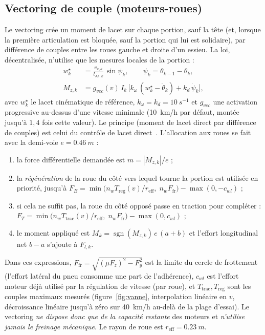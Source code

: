 \documentclass[11pt,a4paper]{article}
\newcommand{\dt}[1]{\dot{#1}}
\begin{document}
\subsection{Vectoring de couple (moteurs-roues)}\label{sec:vec}
Le vectoring crée un moment de lacet sur chaque portion, sauf la tête (et, lorsque la première articulation est bloquée, sauf la portion qui lui est solidaire), par différence de couples entre les roues gauche et droite d'un essieu. La loi, décentralisée, n'utilise que les mesures locales de la portion :
\begin{align}
 w^\star_k&=\frac{v_{x,k}}{l_{JA,k}}\,\sin\psi_k,\qquad \psi_k=\theta_{k-1}-\theta_k,\\
 M_{z,k}&=g_{vec}(v)\,I_k\,\big[k_\omega\,(w^\star_k-\dt\theta_k)+k_d\,\dt\psi_k\big],
\end{align}
avec $w^\star_k$ le lacet cinématique de référence, $k_\omega=k_d=\SI{10}{s^{-1}}$ et $g_{vec}$ une activation progressive au-dessus d'une vitesse minimale (\SI{10}{km/h} par défaut, montée jusqu'à $1{,}4$ fois cette valeur). Le principe (moment de lacet direct par différence de couples) est celui du contrôle de lacet direct~\cite{Shibahata1993,Hori2004,DeNovellis2014}. L'allocation aux roues se fait avec la demi-voie $e=\SI{0,46}{m}$ :
\begin{enumerate}
 \item la force différentielle demandée est $m=|M_{z,k}|/e$ ;
 \item la \emph{régénération} de la roue du côté vers lequel tourne la portion est utilisée en priorité, jusqu'à $F_B=\min\big(n_wT_{\text{reg}}(v)/r_{\text{eff}},\;n_w F_{\text{fr}}\big)-\max(0,-c_{wl})$ ;
 \item si cela ne suffit pas, la roue du côté opposé passe en traction pour compléter : $F_T=\min\big(n_wT_{\text{trac}}(v)/r_{\text{eff}},\;n_wF_{\text{fr}}\big)-\max(0,c_{wl})$ ;
 \item le moment appliqué est $M_k=\operatorname{sgn}(M_{z,k})\,e\,(a+b)$ et l'effort longitudinal net $b-a$ s'ajoute à $F_{l,k}$.
\end{enumerate}
Dans ces expressions, $F_{\text{fr}}=\sqrt{(\mu F_{z})^2-F_{y}^2}$ est la limite du cercle de frottement (l'effort latéral du pneu consomme une part de l'adhérence), $c_{wl}$ est l'effort moteur déjà utilisé par la régulation de vitesse (par roue), et $T_{\text{trac}},T_{\text{reg}}$ sont les couples maximaux mesurés (figure~\ref{fig:vanne}, interpolation linéaire en $v$, décroissance linéaire jusqu'à zéro sur \SI{40}{km/h} au-delà de la plage d'essai). Le vectoring \emph{ne dispose donc que de la capacité restante} des moteurs et \emph{n'utilise jamais le freinage mécanique}. Le rayon de roue est $r_{\text{eff}}=\SI{0,23}{m}$.
\end{document}
